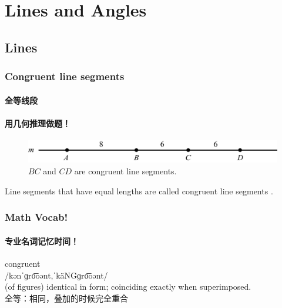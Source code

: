 \documentclass[
	11pt, %
]{beamer}
\begin{document}

\section{Lines and Angles}


\subsection{Lines}


\begin{frame}
	\frametitle{Congruent line segments} %
	\framesubtitle{全等线段}
	\framesubtitle{用几何推理做题！}
		\begin{figure}
			\includegraphics[width=\linewidth]{Lines.jpg}
			\caption{$BC$ and $CD$ are congruent line segments.}
		\end{figure}

		\begin{definition}
		Line segments that have equal lengths are called \alert{congruent line segments} .
		\end{definition}
\end{frame}


\begin{frame}
	\frametitle{Math Vocab!} %
	\framesubtitle{专业名词记忆时间！}
	
	{\Huge congruent}\\
	{\LARGE /kənˈɡro͞oənt,ˈkäNGɡro͞oənt/\\
		\bigskip\bigskip
	(of figures) identical in form; coinciding exactly when superimposed. \\ 
	全等：相同，叠加的时候完全重合}

\end{frame}




\end{document}
